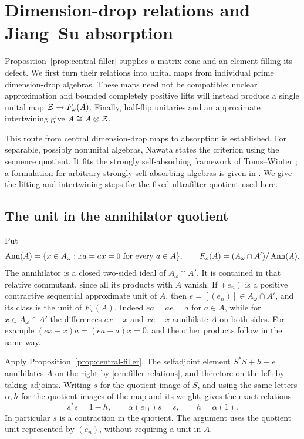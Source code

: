 \section{Dimension-drop relations and Jiang--Su absorption}
\label{abs:section}

Proposition~\ref{prop:central-filler} supplies a matrix cone and an
element filling its defect. We first turn their relations into unital
maps from individual prime dimension-drop algebras. These maps need
not be compatible: nuclear approximation and bounded completely
positive lifts will instead produce a single unital map
$\mathcal Z\to F_\omega(A)$. Finally, half-flip unitaries and an approximate
intertwining give $A\cong A\otimes\mathcal Z$.

This route from central dimension-drop maps to absorption is
established. For separable, possibly nonunital algebras,
Nawata \cite[Proposition~5.1]{Nawata2013} states the criterion using
the sequence quotient. It fits the strongly self-absorbing framework
of Toms--Winter \cite{TW2007}; a formulation for arbitrary strongly
self-absorbing algebras is given in
\cite[Theorem~2.2]{PTV2025}. We give the lifting and intertwining
steps for the fixed ultrafilter quotient used here.

\subsection{The unit in the annihilator quotient}

Put
\[
 \operatorname{Ann}(A)=\{x\in A_\omega:xa=ax=0\text{ for every }a\in A\},
 \qquad
 F_\omega(A)=(A_\omega\cap A')/\operatorname{Ann}(A).
\]
The annihilator is a closed two-sided ideal of $A_\omega\cap A'$.
It is contained in that relative commutant, since all its products
with $A$ vanish.
If $(e_n)$ is a positive contractive sequential approximate unit of
$A$, then $e=[(e_n)]\in A_\omega\cap A'$, and its class is the unit
of $F_\omega(A)$.  Indeed $ea=ae=a$ for $a\in A$, while for
$x\in A_\omega\cap A'$ the differences $ex-x$ and $xe-x$
annihilate $A$ on both sides.  For example
$(ex-x)a=(ea-a)x=0$, and the other products follow in the same way.

Apply Proposition~\ref{prop:central-filler}.  The selfadjoint element
$S^*S+h-e$ annihilates $A$ on the right by
\eqref{cen:filler-relations}, and therefore on the left by taking
adjoints.  Writing $s$ for the quotient image of $S$, and using the
same letters $\alpha,h$ for the quotient images of the map and its
weight, gives the exact relations
\begin{equation}\label{abs:quotient-relations}
 s^*s=1-h,\qquad \alpha(e_{11})s=s,
 \qquad h=\alpha(1).
\end{equation}
In particular $s$ is a contraction in the quotient.  The argument uses
the quotient unit represented by $(e_n)$, without requiring a unit in
$A$.

